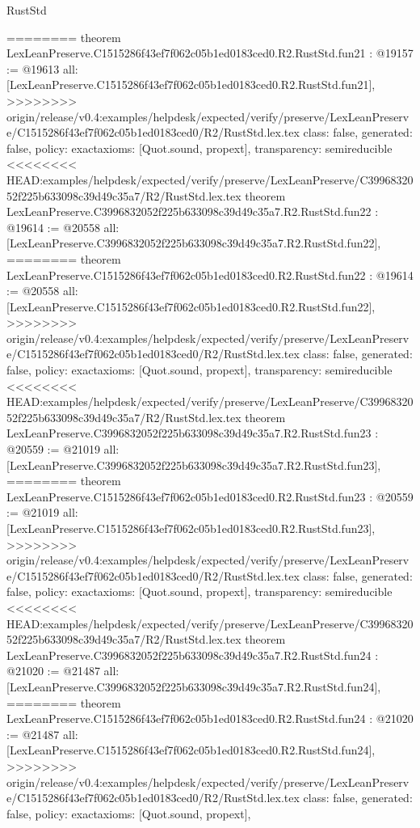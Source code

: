 \begin{lexlean}{RustStd}
\begin{coremodule}
{\begin{coremodule}
{{{{{{{{{{{{{{{{{{{{{{{{========
theorem LexLeanPreserve.C1515286f43ef7f062c05b1ed0183ced0.R2.RustStd.fun21 : @19157 := @19613 {
  all: [LexLeanPreserve.C1515286f43ef7f062c05b1ed0183ced0.R2.RustStd.fun21],
>>>>>>>> origin/release/v0.4:examples/helpdesk/expected/verify/preserve/LexLeanPreserve/C1515286f43ef7f062c05b1ed0183ced0/R2/RustStd.lex.tex
  class: false,
  generated: false,
  policy: exact{axioms: [Quot.sound, propext]},
  transparency: semireducible
}
<<<<<<<< HEAD:examples/helpdesk/expected/verify/preserve/LexLeanPreserve/C3996832052f225b633098c39d49c35a7/R2/RustStd.lex.tex
theorem LexLeanPreserve.C3996832052f225b633098c39d49c35a7.R2.RustStd.fun22 : @19614 := @20558 {
  all: [LexLeanPreserve.C3996832052f225b633098c39d49c35a7.R2.RustStd.fun22],
========
theorem LexLeanPreserve.C1515286f43ef7f062c05b1ed0183ced0.R2.RustStd.fun22 : @19614 := @20558 {
  all: [LexLeanPreserve.C1515286f43ef7f062c05b1ed0183ced0.R2.RustStd.fun22],
>>>>>>>> origin/release/v0.4:examples/helpdesk/expected/verify/preserve/LexLeanPreserve/C1515286f43ef7f062c05b1ed0183ced0/R2/RustStd.lex.tex
  class: false,
  generated: false,
  policy: exact{axioms: [Quot.sound, propext]},
  transparency: semireducible
}
<<<<<<<< HEAD:examples/helpdesk/expected/verify/preserve/LexLeanPreserve/C3996832052f225b633098c39d49c35a7/R2/RustStd.lex.tex
theorem LexLeanPreserve.C3996832052f225b633098c39d49c35a7.R2.RustStd.fun23 : @20559 := @21019 {
  all: [LexLeanPreserve.C3996832052f225b633098c39d49c35a7.R2.RustStd.fun23],
========
theorem LexLeanPreserve.C1515286f43ef7f062c05b1ed0183ced0.R2.RustStd.fun23 : @20559 := @21019 {
  all: [LexLeanPreserve.C1515286f43ef7f062c05b1ed0183ced0.R2.RustStd.fun23],
>>>>>>>> origin/release/v0.4:examples/helpdesk/expected/verify/preserve/LexLeanPreserve/C1515286f43ef7f062c05b1ed0183ced0/R2/RustStd.lex.tex
  class: false,
  generated: false,
  policy: exact{axioms: [Quot.sound, propext]},
  transparency: semireducible
}
<<<<<<<< HEAD:examples/helpdesk/expected/verify/preserve/LexLeanPreserve/C3996832052f225b633098c39d49c35a7/R2/RustStd.lex.tex
theorem LexLeanPreserve.C3996832052f225b633098c39d49c35a7.R2.RustStd.fun24 : @21020 := @21487 {
  all: [LexLeanPreserve.C3996832052f225b633098c39d49c35a7.R2.RustStd.fun24],
========
theorem LexLeanPreserve.C1515286f43ef7f062c05b1ed0183ced0.R2.RustStd.fun24 : @21020 := @21487 {
  all: [LexLeanPreserve.C1515286f43ef7f062c05b1ed0183ced0.R2.RustStd.fun24],
>>>>>>>> origin/release/v0.4:examples/helpdesk/expected/verify/preserve/LexLeanPreserve/C1515286f43ef7f062c05b1ed0183ced0/R2/RustStd.lex.tex
  class: false,
  generated: false,
  policy: exact{axioms: [Quot.sound, propext]},
}}}}}}}}}}}}}}}}}}}}}}}}}}}}
\end{coremodule}}
\end{coremodule}
\end{lexlean}
